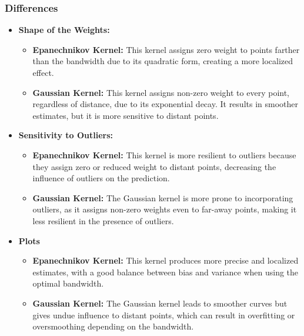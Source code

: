 \subsubsection{Differences}
\begin{itemize}
    \item \textbf{Shape of the Weights:}
    \begin{itemize}
        \item \textbf{Epanechnikov Kernel:} This kernel assigns zero weight to points farther than the bandwidth due to its quadratic form, creating a more localized effect.
        \item \textbf{Gaussian Kernel:} This kernel assigns non-zero weight to every point, regardless of distance, due to its exponential decay. It results in smoother estimates, but it is more sensitive to distant points.
    \end{itemize}
    
    \item \textbf{Sensitivity to Outliers:}
    \begin{itemize}
        \item \textbf{Epanechnikov Kernel:} This kernel is more resilient to outliers because they assign zero or reduced weight to distant points, decreasing the influence of outliers on the prediction.
        \item \textbf{Gaussian Kernel:} The Gaussian kernel is more prone to incorporating outliers, as it assigns non-zero weights even to far-away points, making it less resilient in the presence of outliers.
    \end{itemize}
    \item \textbf{Plots}
    \begin{itemize}
        \item \textbf{Epanechnikov Kernel:} This kernel produces more precise and localized estimates, with a good balance between bias and variance when using the optimal bandwidth.
        \item \textbf{Gaussian Kernel:} The Gaussian kernel leads to smoother curves but gives undue influence to distant points, which can result in overfitting or oversmoothing depending on the bandwidth.
    \end{itemize}
\end{itemize}





